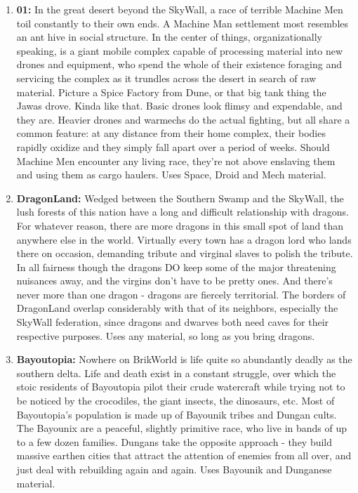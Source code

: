 \documentclass[12pt,a4paper,twocolumn]{article}
\begin{document}
\begin{enumerate}
\item {\bf 01:} In the great desert beyond the SkyWall, a race of terrible Machine Men toil constantly to their own ends.  A Machine Man settlement most resembles an ant hive in social structure.  In the center of things, organizationally speaking, is a giant mobile complex capable of processing material into new drones and equipment, who spend the whole of their existence foraging and servicing the complex as it trundles across the desert in search of raw material.  Picture a Spice Factory from Dune, or that big tank thing the Jawas drove.  Kinda like that.  Basic drones look flimsy and expendable, and they are.  Heavier drones and warmechs do the actual fighting, but all share a common feature: at any distance from their home complex, their bodies rapidly oxidize and they simply fall apart over a period of weeks.  Should Machine Men encounter any living race, they're not above enslaving them and using them as cargo haulers.  Uses Space, Droid and Mech material.

\item {\bf DragonLand:} Wedged between the Southern Swamp and the SkyWall, the lush forests of this nation have a long and difficult relationship with dragons.  For whatever reason, there are more dragons in this small spot of land than anywhere else in the world.  Virtually every town has a dragon lord who lands there on occasion, demanding tribute and virginal slaves to polish the tribute.  In all fairness though the dragons DO keep some of the major threatening nuisances away, and the virgins don't have to be pretty ones.  And there's never more than one dragon - dragons are fiercely territorial.  The borders of DragonLand overlap considerably with that of its neighbors, especially the SkyWall federation, since dragons and dwarves both need caves for their respective purposes.  Uses any material, so long as you bring dragons. 

\item {\bf Bayoutopia:} Nowhere on BrikWorld is life quite so abundantly deadly as the southern delta.  Life and death exist in a constant struggle, over which the stoic residents of Bayoutopia pilot their crude watercraft while trying not to be noticed by the crocodiles, the giant insects, the dinosaurs, etc.  Most of Bayoutopia's population is made up of Bayounik tribes and Dungan cults.  The Bayounix are a peaceful, slightly primitive race, who live in bands of up to a few dozen families.  Dungans take the opposite approach - they build massive earthen cities that attract the attention of enemies from all over, and just deal with rebuilding again and again.  Uses Bayounik and Dunganese material. 


\end{enumerate}
\end{document}
